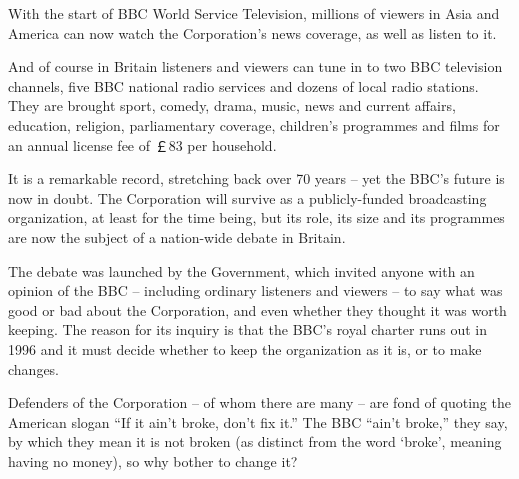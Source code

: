 \documentclass[a4paper]{article}
\begin{document}
\par
With the start of BBC World Service Television, millions of viewers in Asia and America can now watch the Corporation’s news coverage, as well as listen to it.

\par
And of course in Britain listeners and viewers can tune in to two BBC television channels, five BBC national radio services and dozens of local radio stations. They are brought sport, comedy, drama, music, news and current affairs, education, religion, parliamentary coverage, children’s programmes and films for an annual license fee of ￡83 per household.

\par
It is a remarkable record, stretching back over 70 years -- yet the BBC’s future is now in doubt. The Corporation will survive as a publicly-funded broadcasting organization, at least for the time being, but its role, its size and its programmes are now the subject of a nation-wide debate in Britain.

\par
The debate was launched by the Government, which invited anyone with an opinion of the BBC -- including ordinary listeners and viewers -- to say what was good or bad about the Corporation, and even whether they thought it was worth keeping. The reason for its inquiry is that the BBC’s royal charter runs out in 1996 and it must decide whether to keep the organization as it is, or to make changes.

\par
Defenders of the Corporation -- of whom there are many -- are fond of quoting the American slogan “If it ain’t broke, don’t fix it.” The BBC “ain’t broke,” they say, by which they mean it is not broken (as distinct from the word ‘broke’, meaning having no money), so why bother to change it?
\end{document}
